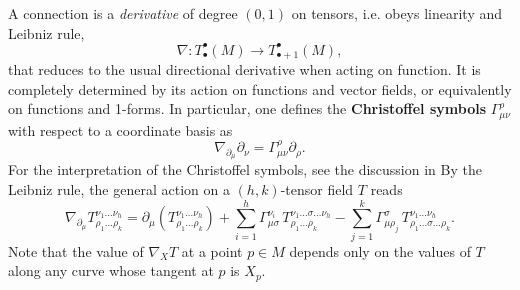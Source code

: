 \begin{mytheorem}[Connection]
A connection is a \emph{derivative} of degree $(0,1)$ on tensors, i.e. obeys linearity and Leibniz rule,
\begin{equation}
    \nabla: T^{\bullet}_{\bullet} (M) \to T^{\bullet}_{\bullet + 1} (M),
\end{equation}
that reduces to the usual directional derivative when acting on function.
It is completely determined by its action on functions and vector fields, or equivalently on functions and 1-forms.
In particular, one defines the \textbf{Christoffel symbols} $\Gamma^{\rho}_{\mu \nu}$ with respect to a coordinate basis as
\begin{equation}
    \nabla_{\partial_\mu} \partial_\nu = \Gamma^{\rho}_{\mu \nu} \partial_\rho.
\end{equation}
For the interpretation of the Christoffel symbols, see the discussion in 
By the Leibniz rule, the general action on a $(h,k)$-tensor field $T$ reads
\begin{equation}\label{eq:connection_on_tensor}
    \nabla_{\partial_\mu} T^{\nu_1 \dots \nu_h}_{ \rho_1 \dots \rho_k} 
    = \partial_\mu\left( T^{\nu_1 \dots \nu_h}_{ \rho_1 \dots \rho_k} \right)
    + \sum_{i=1}^h \Gamma^{\nu_i}_{\mu \sigma} \,T^{\nu_1 \dots \sigma \dots \nu_h}_{ \rho_1 \dots \rho_k} 
    - \sum_{j=1}^k \Gamma^{\sigma}_{\mu \rho_j}\, T^{\nu_1 \dots \nu_h}_{\rho_1 \dots \sigma \dots \rho_k}.
\end{equation}
Note that the value of $\nabla_X T$ at a point $p\in M$ depends only on the values of $T$ along any curve whose tangent at $p$ is $X_p$.
\end{mytheorem}

